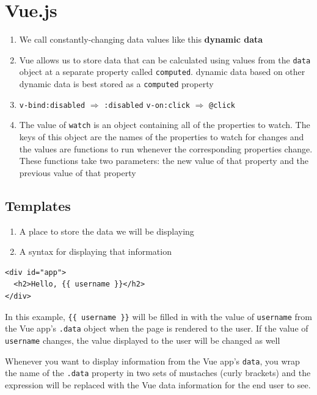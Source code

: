 \documentclass[a4paper, 12pt]{article}
\begin{document}
\section{Vue.js}
\begin{enumerate}
\item We call constantly-changing data values like this \textbf{dynamic data}

\item Vue allows us to store data that can be calculated using values from the \verb|data| object at a separate property called \verb|computed|. dynamic data based on other dynamic data is best stored as a \verb|computed| property

\item \verb|v-bind:disabled| $\Rightarrow$ \verb|:disabled| \quad \verb|v-on:click| $\Rightarrow$ \verb|@click|

\item The value of \verb|watch| is an object containing all of the properties to watch. The keys of this object are the names of the properties to watch for changes and the values are functions to run whenever the corresponding properties change. These functions take two parameters: the new value of that property and the previous value of that property

\end{enumerate}

\subsection{Templates}
\begin{enumerate}
\item A place to store the data we will be displaying
\item A syntax for displaying that information
\end{enumerate}

\begin{verbatim}
<div id="app">
  <h2>Hello, {{ username }}</h2>
</div>
\end{verbatim}

In this example, \verb|{{ username }}| will be filled in with the value of \verb|username| from the Vue app's \verb|.data| object when the page is rendered to the user. If the value of \verb|username| changes, the value displayed to the user will be changed as well

Whenever you want to display information from the Vue app's \verb|data|, you wrap the name of the \verb|.data| property in two sets of mustaches (curly brackets) and the expression will be replaced with the Vue data information for the end user to see.
\end{document}
